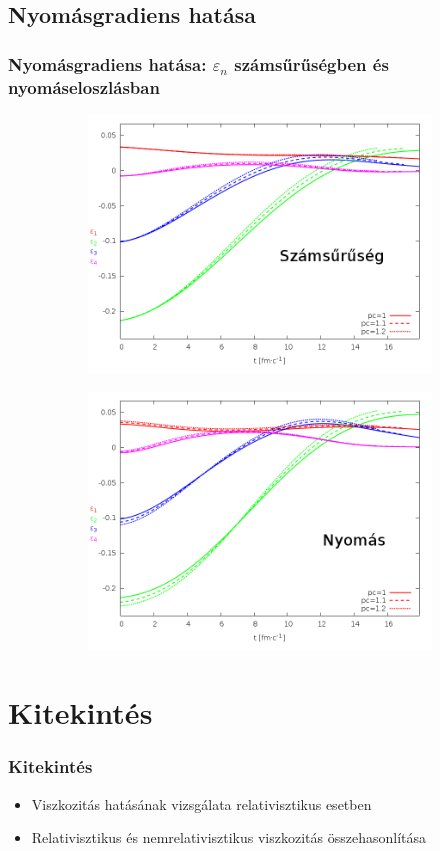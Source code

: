 \documentclass{beamer}
\begin{document}
\subsection{Nyomásgradiens hatása}
\begin{frame}[noframenumbering]
\frametitle{Nyomásgradiens hatása: $\varepsilon_n$ számsűrűségben és nyomáseloszlásban}
\begin{center}
\begin{figure}[H]
	\centering
    \begin{subfigure}[b]{0.49\textwidth}
    		\includegraphics[width=\textwidth]{pic/res/rel/eps_pc_n}
	\end{subfigure}
	\begin{subfigure}[b]{0.49\textwidth}
        	\includegraphics[width=\textwidth]{pic/res/rel/eps_pc_p}
	\end{subfigure}
\end{figure}
\end{center}
\end{frame}

\section{Kitekintés}
\begin{frame}[noframenumbering]
\frametitle{Kitekintés}
\begin{itemize}
\setlength{\itemsep}{20pt}
\item<1-> Viszkozitás hatásának vizsgálata relativisztikus esetben
\item<1-> Relativisztikus és nemrelativisztikus viszkozitás összehasonlítása
\end{itemize}
\end{frame}
\end{document}

